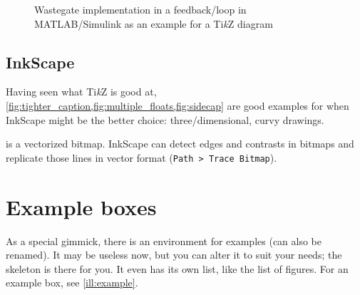 \begin{figure}
{
    }{%
        \caption{%
            Wastegate implementation in a feedback\-/loop in MATLAB/Simulink
            as an example for a Ti\textit{k}Z diagram%
        }%
        \label{fig:tikz_diagram}%
    }%
\end{figure}


\subsection{InkScape}

Having seen what Ti\textit{k}Z is good at,
\cref{fig:tighter_caption,fig:multiple_floats,fig:sidecap}
are good examples for when InkScape might be the better choice:
three\-/dimensional, curvy drawings.

 is a vectorized bitmap.
InkScape can detect edges and contrasts in bitmaps and replicate those lines in
vector format (\texttt{Path > Trace Bitmap}).

\section{Example boxes}

As a special gimmick, there is an environment for examples (can also be renamed).
It may be useless now, but you can alter it to suit your needs; the skeleton is
there for you.
It even has its own list, like the list of figures.
For an example box, see \cref{ill:example}.


